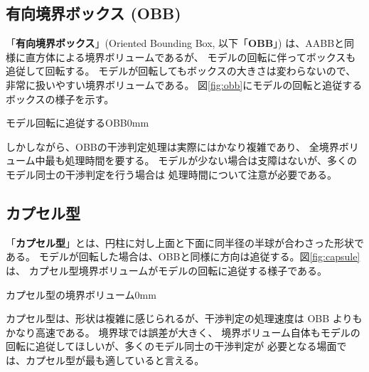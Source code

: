 \subsection{有向境界ボックス (OBB)}
「\textbf{有向境界ボックス}」(Oriented Bounding Box, 以下「\textbf{OBB}」)
は、AABBと同様に直方体による境界ボリュームであるが、
モデルの回転に伴ってボックスも追従して回転する。
モデルが回転してもボックスの大きさは変わらないので、
非常に扱いやすい境界ボリュームである。
図\ref{fig:obb}にモデルの回転と追従するボックスの様子を示す。

	{モデル回転に追従するOBB}{0mm}

しかしながら、OBBの干渉判定処理は実際にはかなり複雑であり、
全境界ボリューム中最も処理時間を要する。
モデルが少ない場合は支障はないが、多くのモデル同士の干渉判定を行う場合は
処理時間について注意が必要である。

\subsection{カプセル型}
「\textbf{カプセル型}」とは、円柱に対し上面と下面に同半径の半球が合わさった形状である。
モデルが回転した場合は、OBBと同様に方向は追従する。図\ref{fig:capsule}は、
カプセル型境界ボリュームがモデルの回転に追従する様子である。

	{カプセル型の境界ボリューム}{0mm}

カプセル型は、形状は複雑に感じられるが、干渉判定の処理速度は OBB よりもかなり高速である。
境界球では誤差が大きく、
境界ボリューム自体もモデルの回転に追従してほしいが、多くのモデル同士の干渉判定が
必要となる場面では、カプセル型が最も適していると言える。

